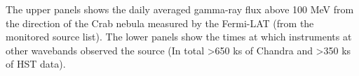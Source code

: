 The upper panels shows the daily averaged gamma-ray flux above 100 MeV from the direction of the Crab nebula measured by the Fermi-LAT (from the monitored source list). The lower panels show the times at which instruments at other wavebands observed the source (In total >650 ks of Chandra and >350 ks of HST data).